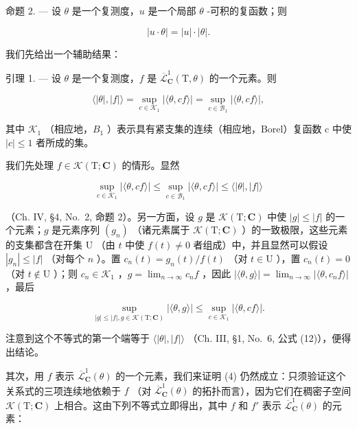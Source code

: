 命题 2. --- 设 \(\theta\) 是一个复测度，\(u\) 是一个局部 \(\theta\) -可积的复函数；则

\[
\left| u \cdot \theta \right| = \left| u \right| \cdot \left| \theta \right|.\tag{3}
\]

我们先给出一个辅助结果：

引理 1. --- 设 \(\theta\) 是一个复测度，\(f\) 是 \(\overline{\mathcal{L}}_{\mathbf{C}}^{1}(\mathrm{T},\theta)\) 的一个元素。则

\[
\langle | \theta |, | f | \rangle = \sup _ {c \in \mathcal {K} _ {1}} | \langle \theta , c f \rangle | = \sup _ {c \in \mathcal {B} _ {1}} | \langle \theta , c f \rangle |,\tag{4}
\]

其中 \(\mathcal{K}_{1}\) （相应地，\(B_{1}\) ）表示具有紧支集的连续（相应地，Borel）复函数 c 中使 \(|c| \leqslant 1\) 者所成的集。

我们先处理 \(f \in \mathcal{K}(\mathrm{T};\mathbf{C})\) 的情形。显然

\[
\sup _ {c \in \mathcal {K} _ {1}} | \langle \theta , c f \rangle | \leqslant \sup _ {c \in \mathcal {B} _ {1}} | \langle \theta , c f \rangle | \leqslant \langle | \theta |, | f | \rangle
\]

（Ch. IV, §4, No.~2, 命题 2）。另一方面，设 \(g\) 是 \(\mathcal{K}(\mathrm{T};\mathbf{C})\) 中使 \(|g| \leqslant |f|\) 的一个元素；\(g\) 是元素序列 \((g_n)\) （诸元素属于 \(\mathcal{K}(\mathrm{T};\mathbf{C})\) ）的一致极限，这些元素的支集都含在开集 \(\mathrm{U}\) （由 \(t\) 中使 \(f(t) \neq 0\) 者组成）中，并且显然可以假设 \(|g_n| \leqslant |f|\) （对每个 \(n\) ）。置 \(c_n(t) = g_n(t)/f(t)\) （对 \(t \in \mathrm{U}\) ），置 \(c_n(t) = 0\) （对 \(t \notin \mathrm{U}\) ）；则 \(c_n \in \mathcal{K}_1\) ，\(g = \lim_{n \to \infty} c_n f\) ，因此 \(|\langle \theta, g \rangle| = \lim_{n \to \infty} |\langle \theta, c_n f \rangle|\) ，最后

\[
\sup _ {| g | \leqslant | f |, g \in \mathscr {K} (\mathrm{T}; \mathbf {C})} | \langle \theta , g \rangle | \leqslant \sup _ {c \in \mathscr {K} _ {1}} | \langle \theta , c f \rangle |.
\]

注意到这个不等式的第一个端等于 \(\langle|\theta|,|f|\rangle\) （Ch. III, §1, No.~6, 公式 (12)），便得出结论。

其次，用 \(f\) 表示 \(\overline{\mathcal{L}}_{\mathbf{C}}^{1}(\theta)\) 的一个元素，我们来证明 (4) 仍然成立：只须验证这个关系式的三项连续地依赖于 \(f\) （对 \(\overline{\mathcal{L}}_{\mathbf{C}}^{1}(\theta)\) 的拓扑而言），因为它们在稠密子空间 \(\mathcal{K}(\mathrm{T};\mathbf{C})\) 上相合。这由下列不等式立即得出，其中 \(f\) 和 \(f'\) 表示 \(\overline{\mathcal{L}}_{\mathbf{C}}^{1}(\theta)\) 的元素：

